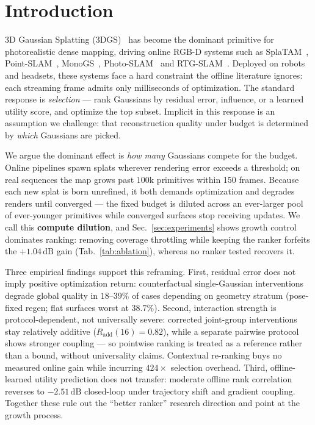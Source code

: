 \documentclass[10pt,twocolumn,letterpaper]{article}
\begin{document}
\section{Introduction}
3D Gaussian Splatting (3DGS)~\cite{kerbl3Dgaussians} has become the dominant primitive for photorealistic dense mapping, driving online RGB-D systems such as SplaTAM~\cite{keetha2023splatam}, Point-SLAM~\cite{sandstrom2023pointslam}, MonoGS~\cite{matsuki2024gaussian}, Photo-SLAM~\cite{huang2024photoslam} and RTG-SLAM~\cite{peng2024rtgslam}.
Deployed on robots and headsets, these systems face a hard constraint the offline literature ignores: each streaming frame admits only milliseconds of optimization.
The standard response is \textit{selection} --- rank Gaussians by residual error, influence, or a learned utility score, and optimize the top subset.
Implicit in this response is an assumption we challenge: that reconstruction quality under budget is determined by \textit{which} Gaussians are picked.

We argue the dominant effect is \textit{how many} Gaussians compete for the budget.
Online pipelines spawn splats wherever rendering error exceeds a threshold; on real sequences the map grows past $100\mathrm{k}$ primitives within 150 frames.
Because each new splat is born unrefined, it both demands optimization and degrades renders until converged --- the fixed budget is diluted across an ever-larger pool of ever-younger primitives while converged surfaces stop receiving updates.
We call this \textbf{compute dilution}, and Sec.~\ref{sec:experiments} shows growth control dominates ranking: removing coverage throttling while keeping the ranker forfeits the $+1.04\,\mathrm{dB}$ gain (Tab.~\ref{tab:ablation}), whereas no ranker tested recovers it.

Three empirical findings support this reframing.
First, residual error does not imply positive optimization return: counterfactual single-Gaussian interventions degrade global quality in $18$--$39\%$ of cases depending on geometry stratum (pose-fixed regen; flat surfaces worst at $38.7\%$).
Second, interaction strength is protocol-dependent, not universally severe: corrected joint-group interventions stay relatively additive ($R_{\mathrm{add}}(16) = 0.82$), while a separate pairwise protocol shows stronger coupling --- so pointwise ranking is treated as a reference rather than a bound, without universality claims. Contextual re-ranking buys no measured online gain while incurring $424\times$ selection overhead.
Third, offline-learned utility prediction does not transfer: moderate offline rank correlation reverses to $-2.51\,\mathrm{dB}$ closed-loop under trajectory shift and gradient coupling.
Together these rule out the ``better ranker'' research direction and point at the growth process.
\end{document}
